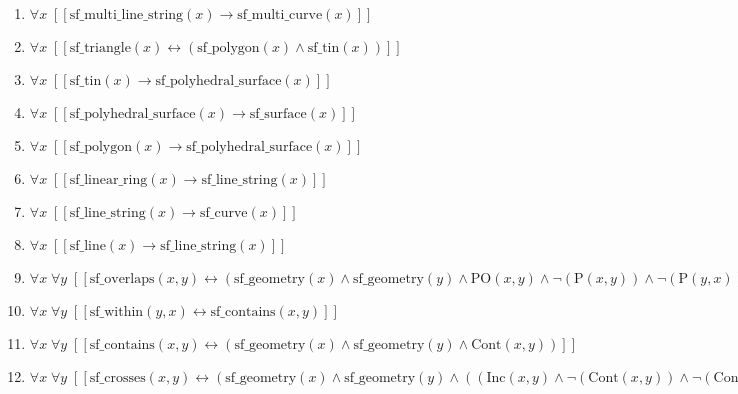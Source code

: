 \documentclass{article}
\begin{document}
\begin{enumerate}
\item $\forall x\;  \left[ \left[ \textrm{sf\_multi\_line\_string}(x) \rightarrow \textrm{sf\_multi\_curve}(x) \right] \right]$
\item $\forall x\;  \left[ \left[ \textrm{sf\_triangle}(x) \leftrightarrow \left(\textrm{sf\_polygon}(x) \land \textrm{sf\_tin}(x)\right) \right] \right]$
\item $\forall x\;  \left[ \left[ \textrm{sf\_tin}(x) \rightarrow \textrm{sf\_polyhedral\_surface}(x) \right] \right]$
\item $\forall x\;  \left[ \left[ \textrm{sf\_polyhedral\_surface}(x) \rightarrow \textrm{sf\_surface}(x) \right] \right]$
\item $\forall x\;  \left[ \left[ \textrm{sf\_polygon}(x) \rightarrow \textrm{sf\_polyhedral\_surface}(x) \right] \right]$
\item $\forall x\;  \left[ \left[ \textrm{sf\_linear\_ring}(x) \rightarrow \textrm{sf\_line\_string}(x) \right] \right]$
\item $\forall x\;  \left[ \left[ \textrm{sf\_line\_string}(x) \rightarrow \textrm{sf\_curve}(x) \right] \right]$
\item $\forall x\;  \left[ \left[ \textrm{sf\_line}(x) \rightarrow \textrm{sf\_line\_string}(x) \right] \right]$
\item $\forall x\; \forall y\;  \left[ \left[ \textrm{sf\_overlaps}(x,y) \leftrightarrow \left(\textrm{sf\_geometry}(x) \land \textrm{sf\_geometry}(y) \land \textrm{PO}(x,y) \land \neg \left(\textrm{P}(x,y)\right) \land \neg \left(\textrm{P}(y,x)\right)\right) \right] \right]$
\item $\forall x\; \forall y\;  \left[ \left[ \textrm{sf\_within}(y,x) \leftrightarrow \textrm{sf\_contains}(x,y) \right] \right]$
\item $\forall x\; \forall y\;  \left[ \left[ \textrm{sf\_contains}(x,y) \leftrightarrow \left(\textrm{sf\_geometry}(x) \land \textrm{sf\_geometry}(y) \land \textrm{Cont}(x,y)\right) \right] \right]$
\item $\forall x\; \forall y\;  \left[ \left[ \textrm{sf\_crosses}(x,y) \leftrightarrow \left(\textrm{sf\_geometry}(x) \land \textrm{sf\_geometry}(y) \land \left(\left(\textrm{Inc}(x,y) \land \neg \left(\textrm{Cont}(x,y)\right) \land \neg \left(\textrm{Cont}(y,x)\right)\right) \lor \forall z\;  \left[ \left[ \left(\textrm{Cont}(z,x) \land \textrm{Cont}(z,y)\right) \rightarrow \left(\textrm{lt}(z,x) \land \textrm{lt}(z,y) \land \neg \left(\textrm{BCont}(z,x)\right) \land \neg \left(\textrm{BCont}(z,y)\right)\right) \right] \right] \lor \left(\textrm{SC}(x,y) \land \textrm{Curve}(x) \land \textrm{Curve}(y)\right)\right)\right) \right] \right]$

\end{enumerate}
\end{document}
